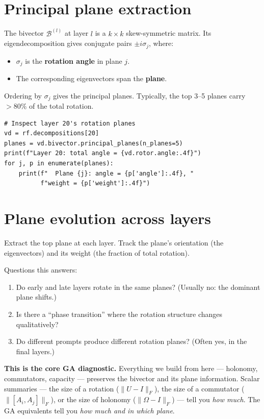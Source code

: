\documentclass[11pt, twoside, openright]{memoir}
\newcommand{\bivec}[1]{\mathcal{B}^{(#1)}}  %
\begin{document}
\section{Principal plane extraction}

The bivector $\bivec{l}$ at layer $l$ is a $k \times k$ skew-symmetric
matrix.  Its eigendecomposition gives conjugate pairs $\pm i\sigma_j$,
where:
\begin{itemize}[nosep]
\item $\sigma_j$ is the \textbf{rotation angle} in plane $j$.
\item The corresponding eigenvectors span the \textbf{plane}.
\end{itemize}

Ordering by $\sigma_j$ gives the principal planes.  Typically, the top
3--5 planes carry $>80\%$ of the total rotation.

\begin{lstlisting}[caption={Principal planes of a layer's bivector}]
# Inspect layer 20's rotation planes
vd = rf.decompositions[20]
planes = vd.bivector.principal_planes(n_planes=5)
print(f"Layer 20: total angle = {vd.rotor.angle:.4f}")
for j, p in enumerate(planes):
    print(f"  Plane {j}: angle = {p['angle']:.4f}, "
          f"weight = {p['weight']:.4f}")
\end{lstlisting}

\section{Plane evolution across layers}

Extract the top plane at each layer.  Track the plane's orientation
(the eigenvectors) and its weight (the fraction of total rotation).

Questions this answers:
\begin{enumerate}[nosep]
\item Do early and late layers rotate in the same planes?
  (Usually no: the dominant plane shifts.)
\item Is there a ``phase transition'' where the rotation structure
  changes qualitatively?
\item Do different prompts produce different rotation planes?
  (Often yes, in the final layers.)
\end{enumerate}

\begin{gabox}
\textbf{This is the core GA diagnostic.}  Everything we build from here
--- holonomy, commutators, capacity --- preserves the bivector and its
plane information.  Scalar summaries --- the size of a rotation
($\|U - I\|_F$), the size of a commutator ($\|[A_i, A_j]\|_F$), or the
size of holonomy ($\|\Omega - I\|_F$) --- tell you \emph{how much}.
The GA equivalents tell you \emph{how much and in which plane}.
\end{gabox}
\end{document}
